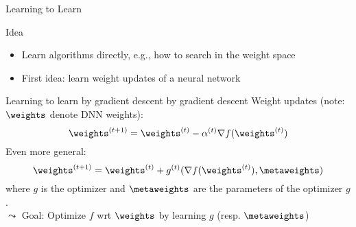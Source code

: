 \begin{frame}[c]{Learning to Learn}

\begin{block}{Idea}
\begin{itemize}
	\item Learn algorithms directly, e.g., how to search in the weight space
	\item First idea: learn weight updates of a neural network
\end{itemize}
\end{block}

\pause

\begin{block}{Learning to learn by gradient descent by gradient descent\newline {}}
Weight updates (note: $\weights$ denote DNN weights):
\begin{equation}
\weights^{(t+1)} = \weights^{(t)} - \alpha^{(t)} \nabla f(\weights^{(t)}) \nonumber
\end{equation}
\pause
Even more general:
\begin{equation}
\weights^{(t+1)} = \weights^{(t)} + g^{(t)}(\nabla f(\weights^{(t)}), \metaweights) \nonumber
\end{equation}
where $g$ is the optimizer and $\metaweights$ are the parameters of the optimizer $g$.\\
\pause
$\leadsto$ \alert{Goal: Optimize $f$ wrt $\weights$ by learning $g$ (resp. $\metaweights$)}
\end{block}

\end{frame}

